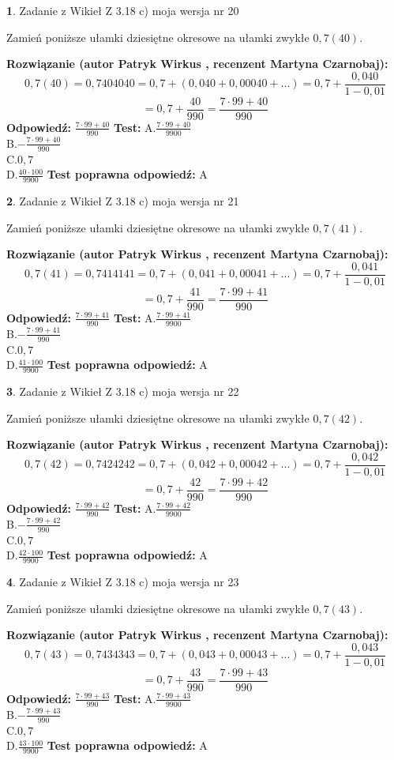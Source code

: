 \documentclass[12pt, a4paper]{article}
\theoremstyle{definition} %
\newtheorem{zad}{}
\newcommand{\zadStart}[1]{\begin{zad}#1\newline}
\newcommand{\zadStop}{\end{zad}}
\newcommand{\rozwStart}[2]{\noindent \textbf{Rozwiązanie (autor #1 , recenzent #2): }\newline}
\newcommand{\rozwStop}{\newline}
\newcommand{\odpStart}{\noindent \textbf{Odpowiedź:}\newline}
\newcommand{\odpStop}{\newline}
\newcommand{\testStart}{\noindent \textbf{Test:}\newline}
\newcommand{\testStop}{\newline}
\newcommand{\kluczStart}{\noindent \textbf{Test poprawna odpowiedź:}\newline}
\newcommand{\kluczStop}{\newline}
\begin{document}
\zadStart{Zadanie z Wikieł Z 3.18 c) moja wersja nr 20}

Zamień poniższe ułamki dziesiętne okresowe na ułamki zwykłe $0,7(40)$.
\zadStop
\rozwStart{Patryk Wirkus}{Martyna Czarnobaj}
$$0,7(40)=0,7404040=0,7+(0,040+0,00040+...)=0,7+\frac{0,040}{1-0,01}$$
$$=0,7+\frac{40}{990}=\frac{7\cdot99+40}{990}$$
\rozwStop
\odpStart
$\frac{7\cdot99+40}{990}$
\odpStop
\testStart
A.$\frac{7\cdot99+40}{9900}$\\ B.$-\frac{7\cdot99+40}{990}$\\ C.$0,7$\\ D.$\frac{40\cdot100}{9900}$
\testStop
\kluczStart
A
\kluczStop



\zadStart{Zadanie z Wikieł Z 3.18 c) moja wersja nr 21}

Zamień poniższe ułamki dziesiętne okresowe na ułamki zwykłe $0,7(41)$.
\zadStop
\rozwStart{Patryk Wirkus}{Martyna Czarnobaj}
$$0,7(41)=0,7414141=0,7+(0,041+0,00041+...)=0,7+\frac{0,041}{1-0,01}$$
$$=0,7+\frac{41}{990}=\frac{7\cdot99+41}{990}$$
\rozwStop
\odpStart
$\frac{7\cdot99+41}{990}$
\odpStop
\testStart
A.$\frac{7\cdot99+41}{9900}$\\ B.$-\frac{7\cdot99+41}{990}$\\ C.$0,7$\\ D.$\frac{41\cdot100}{9900}$
\testStop
\kluczStart
A
\kluczStop



\zadStart{Zadanie z Wikieł Z 3.18 c) moja wersja nr 22}

Zamień poniższe ułamki dziesiętne okresowe na ułamki zwykłe $0,7(42)$.
\zadStop
\rozwStart{Patryk Wirkus}{Martyna Czarnobaj}
$$0,7(42)=0,7424242=0,7+(0,042+0,00042+...)=0,7+\frac{0,042}{1-0,01}$$
$$=0,7+\frac{42}{990}=\frac{7\cdot99+42}{990}$$
\rozwStop
\odpStart
$\frac{7\cdot99+42}{990}$
\odpStop
\testStart
A.$\frac{7\cdot99+42}{9900}$\\ B.$-\frac{7\cdot99+42}{990}$\\ C.$0,7$\\ D.$\frac{42\cdot100}{9900}$
\testStop
\kluczStart
A
\kluczStop



\zadStart{Zadanie z Wikieł Z 3.18 c) moja wersja nr 23}

Zamień poniższe ułamki dziesiętne okresowe na ułamki zwykłe $0,7(43)$.
\zadStop
\rozwStart{Patryk Wirkus}{Martyna Czarnobaj}
$$0,7(43)=0,7434343=0,7+(0,043+0,00043+...)=0,7+\frac{0,043}{1-0,01}$$
$$=0,7+\frac{43}{990}=\frac{7\cdot99+43}{990}$$
\rozwStop
\odpStart
$\frac{7\cdot99+43}{990}$
\odpStop
\testStart
A.$\frac{7\cdot99+43}{9900}$\\ B.$-\frac{7\cdot99+43}{990}$\\ C.$0,7$\\ D.$\frac{43\cdot100}{9900}$
\testStop
\kluczStart
A
\kluczStop
\end{document}
